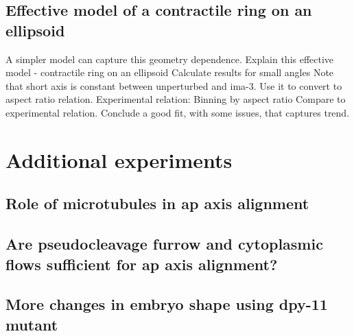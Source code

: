 \subsection{Effective model of a contractile ring on an ellipsoid}\label{sec:minimalModelGeometry}
A simpler model can capture this geometry dependence. 
Explain this effective model - contractile ring on an ellipsoid
Calculate results for small angles
Note that short axis is constant between unperturbed and ima-3. Use it to convert to aspect ratio relation.
Experimental relation: Binning by aspect ratio
Compare to experimental relation. Conclude a good fit, with some issues, that captures trend.

\section{Additional experiments}\label{sec:additionalExp}
\subsection{Role of microtubules in \ac{ap} axis alignment}\label{subsec:MicrotubuleRoleGoa1Gpa16}
\subsection{Are pseudocleavage furrow and cytoplasmic flows sufficient for \ac{ap} axis alignment?}\label{subsec:sufficiencyTestAir1Nop1Mel11}
\subsection{More changes in embryo shape using dpy-11 mutant}\label{sec:moreRounderEmbryosDpy11Ima3}